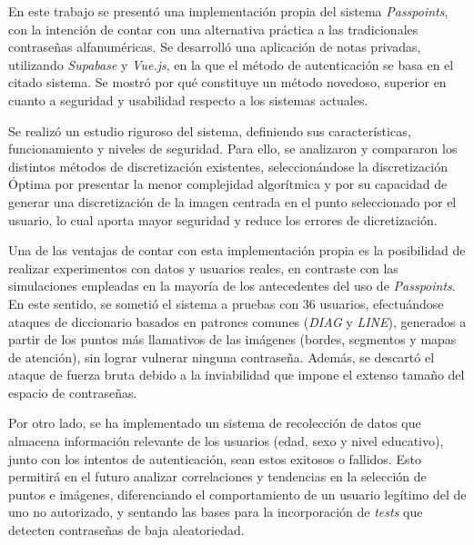 \begin{conclusions}
En este trabajo se presentó una implementación propia del sistema \textit{Passpoints}, con la intención de contar con una alternativa práctica a las tradicionales contraseñas alfanuméricas. Se desarrolló una aplicación de notas privadas, utilizando \textit{Supabase} y \textit{Vue.js}, en la que el método de autenticación se basa en el citado sistema. Se mostró por qué constituye un método novedoso, superior en cuanto a seguridad y usabilidad respecto a los sistemas actuales.

Se realizó un estudio riguroso del sistema, definiendo sus características, funcionamiento y niveles de seguridad. Para ello, se analizaron y compararon los distintos métodos de discretización existentes, seleccionándose la discretización Óptima por presentar la menor complejidad algorítmica y por su capacidad de generar una discretización de la imagen centrada en el punto seleccionado por el usuario, lo cual aporta mayor seguridad y reduce los errores de dicretizaci\'on.

Una de las ventajas de contar con esta implementación propia es la posibilidad de realizar experimentos con datos y usuarios reales, en contraste con las simulaciones empleadas en la mayoría de los antecedentes del uso de \textit{Passpoints}. En este sentido, se sometió el sistema a pruebas con 36 usuarios, efectuándose ataques de diccionario basados en patrones comunes (\textit{DIAG} y \textit{LINE}), generados a partir de los puntos más llamativos de las imágenes (bordes, segmentos y mapas de atención), sin lograr vulnerar ninguna contraseña. Además, se descartó el ataque de fuerza bruta debido a la inviabilidad que impone el extenso tamaño del espacio de contraseñas.

Por otro lado, se ha implementado un sistema de recolección de datos que almacena información relevante de los usuarios (edad, sexo y nivel educativo), junto con los intentos de autenticación, sean estos exitosos o fallidos. Esto permitirá en el futuro analizar correlaciones y tendencias en la selección de puntos e imágenes, diferenciando el comportamiento de un usuario legítimo del de uno no autorizado, y sentando las bases para la incorporación de \textit{tests} que detecten contraseñas de baja aleatoriedad.

\end{conclusions}
